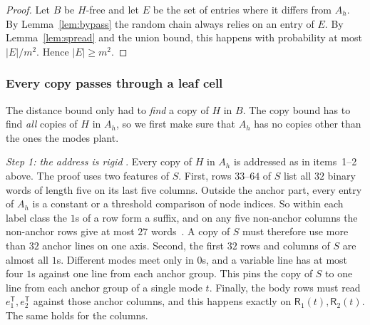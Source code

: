 \documentclass{article}
\theoremstyle{plain}
\theoremstyle{definition}
\begin{document}
\begin{proof}
Let $B$ be $H$-free and let $E$ be the set of entries where it differs from
$A_h$. By Lemma~\ref{lem:bypass} the random chain always relies on an entry of
$E$. By Lemma~\ref{lem:spread} and the union bound, this happens with
probability at most $|E|/m^2$. Hence $|E|\ge m^2$.
\end{proof}

\subsubsection*{Every copy passes through a leaf cell}

The distance bound only had to \emph{find} a copy of $H$ in $B$. The copy
bound has to find \emph{all} copies of $H$ in $A_h$, so we first make sure
that $A_h$ has no copies other than the ones the modes plant.

\emph{Step 1: the address is rigid}
\cite[Lemma~4.4, Corollary~4.5]{openai}. Every copy of $H$ in $A_h$ is
addressed as in items~1--2 above. The proof uses two features of $S$. First,
rows $33$--$64$ of $S$ list all $32$ binary words of length five on its last
five columns. Outside the anchor part, every entry of $A_h$ is a constant or a
threshold comparison of node indices. So within each label class the $1$s of a row form
a suffix, and on any five non-anchor columns the non-anchor rows give at most
$27$ words~\cite[Lemma~4.3]{openai}. A copy of $S$ must therefore use more than
$32$ anchor lines on one axis. Second, the first $32$ rows and columns of $S$
are almost all $1$s. Different modes meet only in $0$s, and a variable line has
at most four $1$s against one line from each anchor group. This pins the copy
of $S$ to one line from each anchor group of a single mode $t$. Finally, the
body rows must read $e_1^{\mathsf T},e_2^{\mathsf T}$ against those anchor
columns, and this happens exactly on $\mathsf R_1(t),\mathsf R_2(t)$. The same
holds for the columns.
\end{document}
